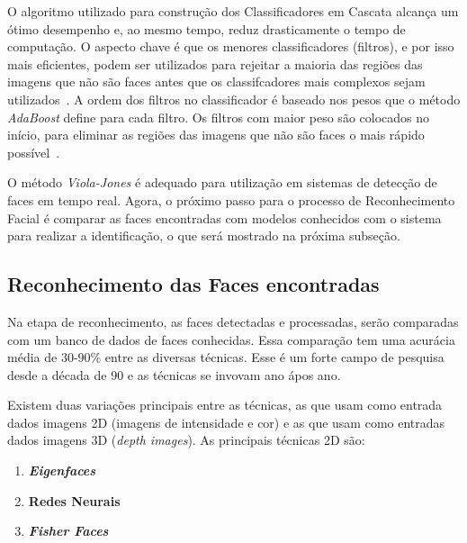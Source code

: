 O algoritmo utilizado para construção dos Classificadores em Cascata alcança um ótimo desempenho e, ao mesmo tempo, reduz drasticamente o tempo de computação. O aspecto chave é que os menores classificadores (filtros), e por isso mais eficientes, podem ser utilizados para rejeitar a maioria das regiões das imagens que não são faces antes que os classifcadores mais complexos sejam utilizados~\cite{violajones}. A ordem dos filtros no classificador é baseado nos pesos que o método \textit{AdaBoost} define para cada filtro. Os filtros com maior peso são colocados no início, para eliminar as regiões das imagens que não são faces o mais rápido possível~\cite{servodetection}. 

O método \textit{Viola-Jones} é adequado para utilização em sistemas de detecção de faces em tempo real. Agora, o próximo passo para o processo de Reconhecimento Facial é comparar as faces encontradas com modelos conhecidos com o sistema para realizar a identificação, o que será mostrado na próxima subseção.


\subsection{Reconhecimento das Faces encontradas}

Na etapa de reconhecimento, as faces detectadas e processadas, serão comparadas com um banco de dados de faces conhecidas. Essa comparação tem uma acurácia média de 30-90\% entre as diversas técnicas. Esse é um forte campo de pesquisa desde a década de 90 e as técnicas se invovam ano ápos ano.

Existem duas variações principais entre as técnicas, as que usam como entrada dados imagens 2D (imagens de intensidade e cor) e as que usam como entradas dados imagens 3D (\textit{depth images}).
As principais técnicas 2D são:
	\begin{enumerate}
		\item \textbf{\textit{Eigenfaces}}
		\item \textbf{Redes Neurais}
		\item \textbf{\textit{Fisher Faces}}
	\end{enumerate}

